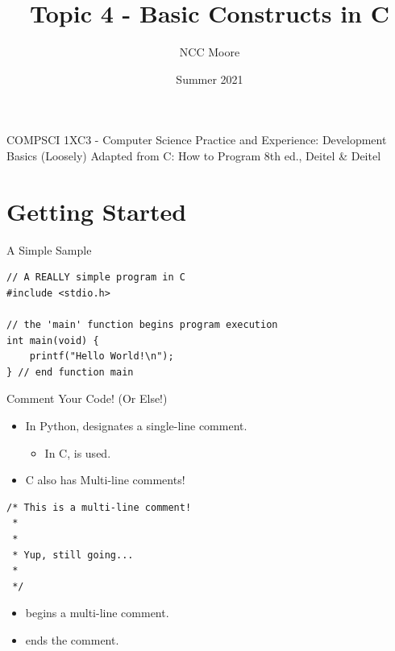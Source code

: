 \documentclass[11pt]{beamer}
\author{NCC Moore}
\title{Topic 4 - Basic Constructs in C}
\institute{McMaster University}
\date{Summer 2021}
\let\OldTexttt\texttt
\renewcommand{\texttt}[1]{\OldTexttt{\color{teal}{#1}}}
\begin{document}
\begin{frame}
\center
COMPSCI 1XC3 - Computer Science Practice and Experience:
Development Basics
\titlepage
(Loosely) Adapted from C: How to Program 8th ed., Deitel \& Deitel
\end{frame}

\begin{frame}
\tableofcontents
\end{frame}



\section[Intro]{Getting Started}
\begin{frame}[fragile=singleslide]{A Simple Sample}
\begin{lstlisting}[style=C]
// A REALLY simple program in C
#include <stdio.h>

// the 'main' function begins program execution
int main(void) {
	printf("Hello World!\n");
} // end function main
\end{lstlisting}
\end{frame}

\begin{frame}[fragile=singleslide]{Comment Your Code! (Or Else!)}
\begin{itemize}
\item In Python, \texttt{\#} designates a single-line comment.
\begin{itemize}
\item In C, \texttt{//} is used.
\end{itemize}
\item C also has Multi-line comments! 
\end{itemize}
\begin{lstlisting}[style = C]
/* This is a multi-line comment! 
 * 
 *
 * Yup, still going...
 *
 */
\end{lstlisting}
\begin{itemize}
\item \texttt{\textbf{/*}} begins a multi-line comment.
\item \texttt{\textbf{*/}} ends the comment.  
\end{itemize}
\end{frame}
\end{document}
